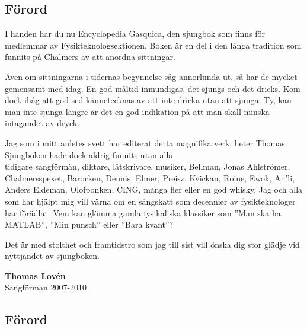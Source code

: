 \begin{flushleft}
\section{Förord}
\end{flushleft}

{\large
\setlength{\parskip}{0.8em}
I handen har du nu Encyclopedia Gasquica, den sjungbok som finns för medlemmar av Fysikteknologsektionen.
Boken är en del i den långa tradition som funnits på Chalmers av att anordna sittningar.

Även om sittningarna i tidernas begynnelse såg annorlunda ut, så har de mycket gemensamt med idag.
En god måltid inmundigas, det sjungs och det dricks.
Kom dock ihåg att god sed kännetecknas av att inte dricka utan att sjunga.
Ty, kan man inte sjunga längre är det en god indikation på att man skall minska intagandet av dryck.

Jag som i mitt anletes svett har editerat detta magnifika verk, heter Thomas.
Sjungboken hade dock aldrig funnits utan alla \\tidigare sångförmän, diktare, låtskrivare, musiker, Bellman, Jonas Ahlströmer, Chalmersspexet, Barocken,
Dennis, Elmer, Preisz, Kvickan, Roine, Ewok, An'li, Anders Eldeman, Olofponken, CING, många fler eller en god whisky.
Jag och alla som har hjälpt mig vill värna om en sångskatt som decennier av fysikteknologer har förädlat.
Vem kan glömma gamla fysikaliska klassiker som ''Man ska ha MATLAB'', ''Min punsch'' eller ''Bara kvant''?

Det är med stolthet och framtidstro som jag till sist vill önska dig stor glädje vid nyttjandet av sjungboken.

\vspace{0.5cm}
\begin{flushright}
\textbf{Thomas Lovén}\\
Sångförman 2007-2010
\end{flushright}
}

\newpage

\begin{flushleft}
\section{Förord}
\end{flushleft}

